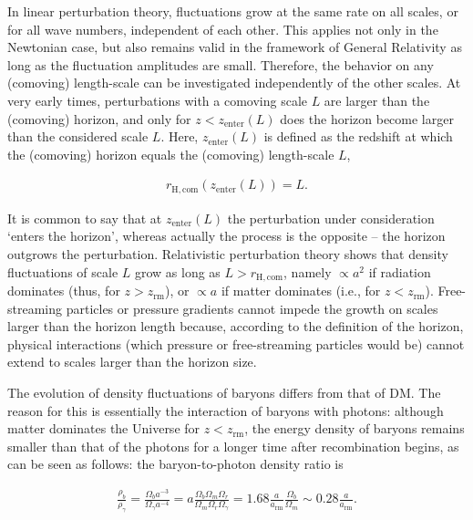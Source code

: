 \documentclass[a4paper,11pt]{article}
\begin{document}
{\noindent}In linear perturbation theory, fluctuations grow at the same rate on all scales, or for all wave numbers, independent of each other. This applies not only in the Newtonian case, but also remains valid in the framework of General Relativity as long as the fluctuation amplitudes are small. Therefore, the behavior on any (comoving) length-scale can be investigated independently of the other scales. At very early times, perturbations with a comoving scale $L$ are larger than the (comoving) horizon, and only for $z<z_\mathrm{enter}(L)$ does the horizon become larger than the considered scale $L$. Here, $z_\mathrm{enter}(L)$ is defined as the redshift at which the (comoving) horizon equals the (comoving) length-scale $L$,

\begin{align*}
    r_\mathrm{H,com}(z_\mathrm{enter}(L)) = L.
\end{align*}

{\noindent}It is common to say that at $z_\mathrm{enter}(L)$ the perturbation under consideration `enters the horizon', whereas actually the process is the opposite -- the horizon outgrows the perturbation. Relativistic perturbation theory shows that density fluctuations of scale $L$ grow as long as $L>r_\mathrm{H,com}$, namely $\propto a^2$ if radiation dominates (thus, for $z>z_\mathrm{rm}$), or $\propto a$ if matter dominates (i.e., for $z<z_\mathrm{rm}$). Free-streaming particles or pressure gradients cannot impede the growth on scales larger than the horizon length because, according to the definition of the horizon, physical interactions (which pressure or free-streaming particles would be) cannot extend to scales larger than the horizon size.

{\noindent}The evolution of density fluctuations of baryons differs from that of DM. The reason for this is essentially the interaction of baryons with photons: although matter dominates the Universe for $z<z_\mathrm{rm}$, the energy density of baryons remains smaller than that of the photons for a longer time after recombination begins, as can be seen as follows: the baryon-to-photon density ratio is

\begin{align*}
    \frac{\rho_b}{\rho_\gamma} = \frac{\Omega_ba^{-3}}{\Omega_\gamma a^{-4}} = a\frac{\Omega_b\Omega_m\Omega_r}{\Omega_m\Omega_r\Omega_\gamma} = 1.68\frac{a}{a_\mathrm{rm}}\frac{\Omega_b}{\Omega_m} \sim 0.28\frac{a}{a_\mathrm{rm}}.
\end{align*}
\end{document}
